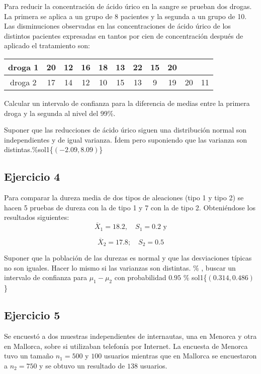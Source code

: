 \documentclass[
]{article}
\begin{document}
Para reducir la concentración de ácido úrico en la sangre se prueban dos
drogas. La primera se aplica a un grupo de 8 pacientes y la segunda a un
grupo de 10. Las disminuciones observadas en las concentraciones de
ácido úrico de los distintos pacientes expresadas en tantos por cien de
concentración después de aplicado el tratamiento son:

\begin{center}
\begin{tabular}{|c|c|c|c|c|c|c|c|c|c|c|}
droga 1 & 20 & 12 & 16 & 18 & 13 & 22 & 15 & 20\\ \hline droga 2 & 17 & 14 & 12 & 10 & 15 &
13 & 9 & 19 & 20 & 11
\end{tabular}
\end{center}

Calcular un intervalo de confianza para la diferencia de medias entre la
primera droga y la segunda al nivel del 99\%.

Suponer que las reducciones de ácido úrico siguen una distribución
normal son independientes y de igual varianza. Ídem pero suponiendo que
las varianza son distintas.\%sol1\{\(\left(-2.09,8.09\right)\)\}

\hypertarget{ejercicio-4}{%
\subsection{Ejercicio 4}\label{ejercicio-4}}

Para comparar la dureza media de dos tipos de aleaciones (tipo 1 y tipo
2) se hacen 5 pruebas de dureza con la de tipo 1 y 7 con la de tipo 2.
Obteniéndose los resultados siguientes:
\[\overline{X}_{1}=18.2,\quad S_{1}=0.2 \mbox{ y}\]

\[\overline{X}_{2}=17.8;\quad S_{2}=0.5\]

Suponer que la población de las durezas es normal y que las desviaciones
típicas no son iguales. Hacer lo mismo si las varianzas son distintas.
\% , buscar un intervalo de confianza para \(\mu_{1}-\mu_{2}\) con
probabilidad \(0.95\) \% sol1\{\(\left(0.314,0.486\right)\)\}

\hypertarget{ejercicio-5}{%
\subsection{Ejercicio 5}\label{ejercicio-5}}

Se encuestó a dos muestras independientes de internautas, una en Menorca
y otra en Mallorca, sobre si utilizaban telefonía por Internet. La
encuesta de Menorca tuvo un tamaño \(n_1=500\) y \(100\) usuarios
mientras que en Mallorca se encuestaron a \(n_2=750\) y se obtuvo un
resultado de \(138\) usuarios.
\end{document}
